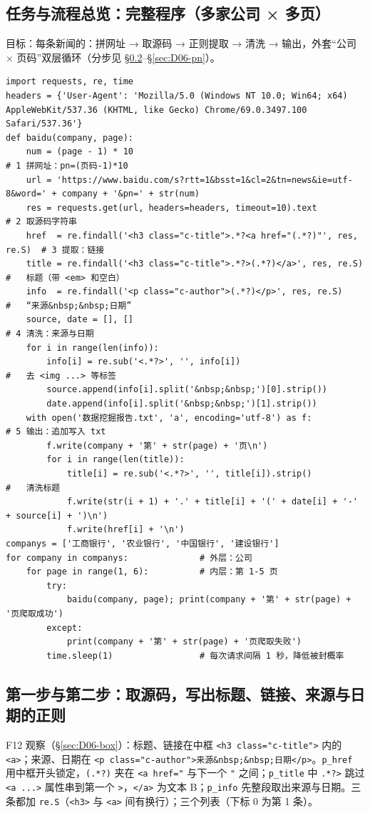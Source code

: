 \subsection{任务与流程总览：完整程序（多家公司 × 多页）}\label{sec:D06-full}
目标：每条新闻的：拼网址 → 取源码 → 正则提取 → 清洗 → 输出，外套“公司 × 页码”双层循环（分步见 §\ref{sec:D06-step12}–§\ref{sec:D06-pn}）。
\begin{lstlisting}[style=pyD06]
import requests, re, time
headers = {'User-Agent': 'Mozilla/5.0 (Windows NT 10.0; Win64; x64) AppleWebKit/537.36 (KHTML, like Gecko) Chrome/69.0.3497.100 Safari/537.36'}
def baidu(company, page):
    num = (page - 1) * 10                                                    # 1 拼网址：pn=(页码-1)*10
    url = 'https://www.baidu.com/s?rtt=1&bsst=1&cl=2&tn=news&ie=utf-8&word=' + company + '&pn=' + str(num)
    res = requests.get(url, headers=headers, timeout=10).text                # 2 取源码字符串
    href  = re.findall('<h3 class="c-title">.*?<a href="(.*?)"', res, re.S)  # 3 提取：链接
    title = re.findall('<h3 class="c-title">.*?>(.*?)</a>', res, re.S)       #   标题（带 <em> 和空白）
    info  = re.findall('<p class="c-author">(.*?)</p>', res, re.S)           #   “来源&nbsp;&nbsp;日期”
    source, date = [], []                                                    # 4 清洗：来源与日期
    for i in range(len(info)):
        info[i] = re.sub('<.*?>', '', info[i])                               #   去 <img ...> 等标签
        source.append(info[i].split('&nbsp;&nbsp;')[0].strip())
        date.append(info[i].split('&nbsp;&nbsp;')[1].strip())
    with open('数据挖掘报告.txt', 'a', encoding='utf-8') as f:               # 5 输出：追加写入 txt
        f.write(company + '第' + str(page) + '页\n')
        for i in range(len(title)):
            title[i] = re.sub('<.*?>', '', title[i]).strip()                 #   清洗标题
            f.write(str(i + 1) + '.' + title[i] + '(' + date[i] + '-' + source[i] + ')\n')
            f.write(href[i] + '\n')
companys = ['工商银行', '农业银行', '中国银行', '建设银行']
for company in companys:              # 外层：公司
    for page in range(1, 6):          # 内层：第 1-5 页
        try:
            baidu(company, page); print(company + '第' + str(page) + '页爬取成功')
        except:
            print(company + '第' + str(page) + '页爬取失败')
        time.sleep(1)                 # 每次请求间隔 1 秒，降低被封概率
\end{lstlisting}

\subsection{第一步与第二步：取源码，写出标题、链接、来源与日期的正则}\label{sec:D06-step12}
F12 观察（§\ref{sec:D06-box}）：标题、链接在中框 \texttt{<h3 class="c-title">} 内的 \texttt{<a>}；来源、日期在 \texttt{<p class="c-author">来源\&nbsp;\&nbsp;日期</p>}。\texttt{p\_href} 用中框开头锁定，\texttt{(.*?)} 夹在 \texttt{<a href="} 与下一个 \texttt{"} 之间；\texttt{p\_title} 中 \texttt{.*?>} 跳过 \texttt{<a ...>} 属性串到第一个 \texttt{>}，\texttt{</a>} 为文本 B；\texttt{p\_info} 先整段取出来源与日期。三条都加 \texttt{re.S}（\texttt{<h3>} 与 \texttt{<a>} 间有换行）；三个列表（下标 0 为第 1 条）。

